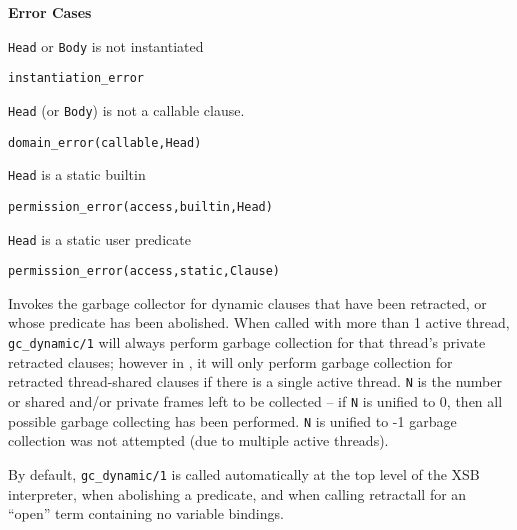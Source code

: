 \begin{description}
{\bf Error Cases}
\bi
\item 	{\tt Head} or {\tt Body} is not instantiated
\bi
\item 	{\tt instantiation\_error}
\ei
%
\item 	{\tt Head} (or {\tt Body}) is not a callable clause.
\bi
\item 	{\tt domain\_error(callable,Head)}
\ei
%
\item 	{\tt Head} is a static builtin
\bi
\item 	{\tt permission\_error(access,builtin,Head)}
\ei
\item 	{\tt Head} is a static user predicate
\bi
\item 	{\tt permission\_error(access,static,Clause)}
\ei
%
\ei

%
Invokes the garbage collector for dynamic clauses that have been
retracted, or whose predicate has been abolished.  When called with
more than 1 active thread, {\tt gc\_dynamic/1} will always perform
garbage collection for that thread's private retracted clauses;
however in \version{}, it will only perform garbage collection for
retracted thread-shared clauses if there is a single active thread.
{\tt N} is the number or shared and/or private frames left to be
collected -- if {\tt N} is unified to 0, then all possible garbage
collecting has been performed.  {\tt N} is unified to -1 garbage
collection was not attempted (due to multiple active threads).

By default, {\tt gc\_dynamic/1} is called automatically at the top
level of the XSB interpreter, when abolishing a predicate, and when
calling retractall for an ``open'' term containing no variable
bindings.

\end{description}
